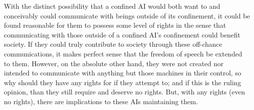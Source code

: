 With the distinct possibility that a confined AI would both want to and conceivably could communicate with beings outside of its confinement, it could be found reasonable for them to possess some level of rights in the sense that communicating with those outside of a confined AI's confinement could benefit society. If they could truly contribute to society through these off-chance communications, it makes perfect sense that the freedom of speech be extended to them. However, on the absolute other hand, they were not created nor intended to communicate with anything but those machines in their control, so why should they have any rights for if they attempt to; and if this is the ruling opinion, than they still require and deserve no rights. But, with any rights (even no rights), there are implications to these AIs maintaining them.